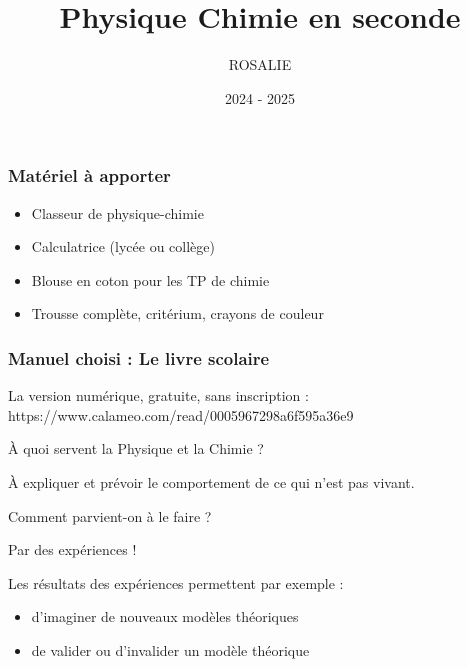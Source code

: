 \documentclass[12pt]{beamer}
\begin{document}
\title{Physique Chimie en seconde}
\author{ROSALIE}
\date{2024 - 2025}

\begin{frame}
\titlepage
\end{frame}

\begin{frame}
    \frametitle{Matériel à apporter}
    \begin{itemize}
        \item Classeur de physique-chimie
        \item Calculatrice (lycée ou collège)
        \item Blouse en coton pour les TP de chimie
        \item Trousse complète, critérium, crayons de couleur
    \end{itemize}
\end{frame}

\begin{frame}
    \frametitle{Manuel choisi : Le livre scolaire}
    La version numérique, gratuite, sans inscription :\\
    https://www.calameo.com/read/0005967298a6f595a36e9

\end{frame}

\begin{frame}
    \begin{center}
        \huge À quoi servent la Physique et la Chimie ?
    \end{center}
\end{frame}

\begin{frame}
    \begin{center}
        \huge À expliquer et prévoir le comportement de ce qui n'est pas vivant.
    \end{center}
\end{frame}

\begin{frame}
    \begin{center}
        \huge Comment parvient-on à le faire ?
    \end{center}
\end{frame}

\begin{frame}
    \begin{center}
        \huge Par des expériences !
    \end{center}
    Les résultats des expériences permettent par exemple :
    \begin{itemize}
        \item d'imaginer de nouveaux modèles théoriques
        \item de valider ou d'invalider un modèle théorique
    \end{itemize}
\end{frame}
\end{document}
